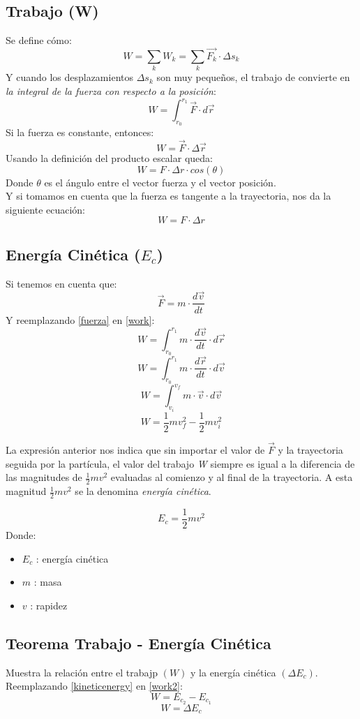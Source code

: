 \documentclass[../main.tex]{subfiles}
\begin{document}
\subsection{Trabajo (W)}
Se define cómo:
\begin{equation} \label{work_force}
    W = \sum_k W_k = \sum_k \vec{F_k} \cdot \Delta s_k
\end{equation}
Y cuando los desplazamientos  $\Delta s_k$ son muy pequeños,
el trabajo de convierte en \textit{la integral de la fuerza con respecto a la posición}:
\begin{equation} \label{work}
    W = \int_{r_0}^{r_1} \vec{F} \cdot d \vec{r} 
\end{equation}
Si la fuerza es constante, entonces:
\[ W = \vec{F} \cdot \Delta \vec{r} \]
Usando la definición del producto escalar queda:
\[ W = F \cdot \Delta r \cdot cos(\theta)\]
Donde $\theta$ es el ángulo entre el vector fuerza y el vector posición.\\
Y si tomamos en cuenta que la fuerza es tangente a la trayectoria,
nos da la siguiente ecuación:
\begin{equation} \label{work1}
    W = F \cdot \Delta r 
\end{equation}

\subsection{Energía Cinética ($E_c$)}
Si tenemos en cuenta que:
\begin{equation} \label{fuerza}
    \vec{F} = m \cdot \frac{d \vec{v}}{dt}
\end{equation}
Y reemplazando \ref{fuerza} en \ref{work}:
\[ W = \int_{r_0}^{r_1} m \cdot \frac{d \vec{v}}{dt} \cdot d \vec{r} \]
\[ W = \int_{r_0}^{r_1} m \cdot \frac{d \vec{r}}{dt} \cdot d \vec{v} \]
\[ W = \int_{v_i}^{v_f} m \cdot \vec{v} \cdot d \vec{v} \]
\begin{equation} \label{work2}
    W = \frac{1}{2}mv_f^2 - \frac{1}{2}mv_i^2 
\end{equation}

La expresión anterior nos indica que sin importar el valor de \(\vec{F}\) y la 
trayectoria seguida por la partícula, el valor del trabajo \textit{W}
siempre es igual a la diferencia de las magnitudes de 
\(\frac{1}{2}mv^2\) evaluadas al comienzo y al final de la
 trayectoria. A esta magnitud \(\frac{1}{2}mv^2 \) se la denomina
\textit{energía cinética}.

\begin{equation} \label{kineticenergy}
    E_c = \frac{1}{2}mv^2 
\end{equation}
Donde:
\begin{itemize}
    \item $E_c$ : energía cinética
    \item $m$ : masa
    \item $v$ : rapidez
\end{itemize}

\subsection{Teorema Trabajo - Energía Cinética}
Muestra la relación entre el trabajp $(W)$ y la energía cinética $(\Delta E_c)$.\\
Reemplazando \ref{kineticenergy} en \ref{work2}:
\[W = E_{c_2} - E_{c_1} \]
\begin{equation} \label{work3}
    W = \Delta E_c
\end{equation}
\end{document}
